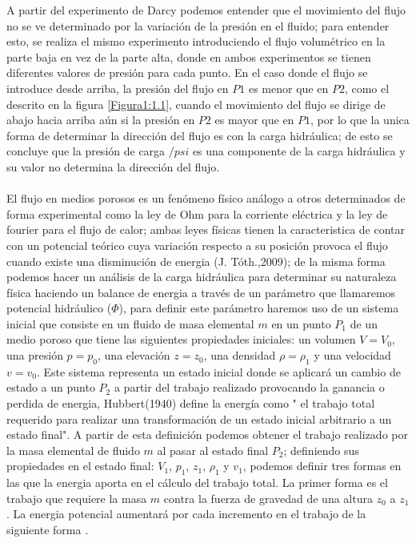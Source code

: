 A partir del experimento de Darcy podemos entender que el movimiento del flujo no se ve determinado por la variación de la presión en el fluido; para entender esto, se realiza el mismo experimento introduciendo el flujo volumétrico en la parte baja en vez de la parte alta, donde en ambos experimentos se tienen diferentes valores de presión para cada punto. En el caso donde el flujo se introduce desde arriba, la presión del flujo en $P1$ es menor que en $P2$, como el descrito en la figura \ref{Figura1:1.1}, cuando el movimiento del flujo se dirige de abajo hacia arriba aún si la presión en $P2$ es mayor que en $P1$, por lo que la unica forma de determinar la dirección del flujo es con la carga hidráulica; de esto se concluye que la presión de carga $/psi$ es una componente de la carga hidráulica y su valor no determina la dirección del flujo. 
\\
\\
El flujo en medios porosos es un fenómeno físico análogo a otros determinados de forma experimental como la ley de Ohm para la corriente eléctrica y la ley de fourier para el flujo de calor; ambas leyes físicas tienen la caracteristica de contar con un potencial teórico cuya variación respecto a su posición provoca el flujo cuando existe una disminución de energia (J. Tóth.,2009); de la misma forma podemos hacer un análisis de la carga hidráulica para determinar su naturaleza física haciendo un balance de energia a través de un parámetro que llamaremos potencial hidráulico ($\Phi$), para definir este parámetro haremos uso de un sistema inicial que consiste en un fluido de masa elemental $m$ en un punto $P_{1}$ de un medio poroso que tiene las siguientes propiedades iniciales: un volumen $V=V_{0}$, una presión $p=p_{0}$, una elevación $z=z_{0}$, una densidad $\rho=\rho_{1}$ y una velocidad $v=v_{0}$. Este sistema representa un estado inicial donde se aplicará un cambio de estado a un punto $P_{2}$ a partir del trabajo realizado provocando la ganancia o perdida de energia, Hubbert(1940) define la energía como " el trabajo total requerido para realizar una transformación de un estado inicial arbitrario a un estado final". A partir de esta definición podemos obtener el trabajo realizado por la masa elemental de fluido $m$ al pasar al estado final $P_{2}$; definiendo sus propiedades en el estado final: $V_{1}$, $p_{1}$, $z_{1}$, $\rho_{1}$ y $v_{1}$, podemos definir tres formas en las que la energia aporta en el cálculo del trabajo total. La primer forma es el trabajo que requiere la masa $m$ contra la fuerza de gravedad de una altura $z_{0}$ a $z_{1}$. La energia potencial aumentará por cada incremento en el trabajo de la siguiente forma \cite{Hubbert1940} .


